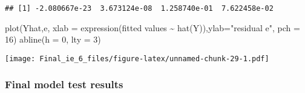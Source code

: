 \documentclass[
  12pt,
]{article}
\newenvironment{Shaded}{\begin{snugshade}}{\end{snugshade}}
\newcommand{\AttributeTok}[1]{\textcolor[rgb]{0.77,0.63,0.00}{#1}}
\newcommand{\DecValTok}[1]{\textcolor[rgb]{0.00,0.00,0.81}{#1}}
\newcommand{\FloatTok}[1]{\textcolor[rgb]{0.00,0.00,0.81}{#1}}
\newcommand{\FunctionTok}[1]{\textcolor[rgb]{0.00,0.00,0.00}{#1}}
\newcommand{\NormalTok}[1]{#1}
\newcommand{\OtherTok}[1]{\textcolor[rgb]{0.56,0.35,0.01}{#1}}
\newcommand{\SpecialCharTok}[1]{\textcolor[rgb]{0.00,0.00,0.00}{#1}}
\newcommand{\StringTok}[1]{\textcolor[rgb]{0.31,0.60,0.02}{#1}}
\begin{document}
\begin{Shaded}
\end{Shaded}

\begin{verbatim}
## [1] -2.080667e-23  3.673124e-08  1.258740e-01  7.622458e-02
\end{verbatim}

\begin{Shaded}
\begin{Highlighting}[]
\FunctionTok{plot}\NormalTok{(Yhat,e, }\AttributeTok{xlab =} \FunctionTok{expression}\NormalTok{(}\StringTok{\textquotesingle{}fitted values\textquotesingle{}} \SpecialCharTok{\textasciitilde{}} \FunctionTok{hat}\NormalTok{(Y)),}\AttributeTok{ylab=}\StringTok{"residual e"}\NormalTok{, }\AttributeTok{pch =} \DecValTok{16}\NormalTok{)}
\FunctionTok{abline}\NormalTok{(}\AttributeTok{h =} \DecValTok{0}\NormalTok{, }\AttributeTok{lty =} \DecValTok{3}\NormalTok{)}
\end{Highlighting}
\end{Shaded}

\texttt{[image: Final\_ie\_6\_files/figure-latex/unnamed-chunk-29-1.pdf]}

\hypertarget{final-model-test-results-2}{%
\subsubsection{Final model test
results}\label{final-model-test-results-2}}
\end{document}
